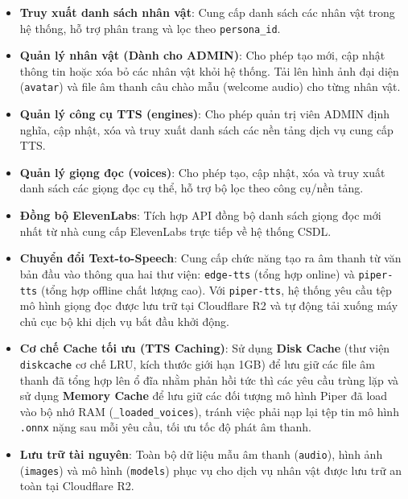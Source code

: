 \begin{itemize}
\item \textbf{Truy xuất danh sách nhân vật}: Cung cấp danh sách các nhân vật trong hệ thống, hỗ trợ phân trang và lọc theo \texttt{persona\_id}.

\item \textbf{Quản lý nhân vật (Dành cho ADMIN)}: Cho phép tạo mới, cập nhật thông tin hoặc xóa bỏ các nhân vật khỏi hệ thống. Tải lên hình ảnh đại diện (\texttt{avatar}) và file âm thanh câu chào mẫu (welcome audio) cho từng nhân vật.

\item \textbf{Quản lý công cụ TTS (engines)}: Cho phép quản trị viên ADMIN định nghĩa, cập nhật, xóa và truy xuất danh sách các nền tảng dịch vụ cung cấp TTS.

\item \textbf{Quản lý giọng đọc (voices)}: Cho phép tạo, cập nhật, xóa và truy xuất danh sách các giọng đọc cụ thể, hỗ trợ bộ lọc theo công cụ/nền tảng.

\item \textbf{Đồng bộ ElevenLabs}: Tích hợp API đồng bộ danh sách giọng đọc mới nhất từ nhà cung cấp ElevenLabs trực tiếp về hệ thống CSDL.

\item \textbf{Chuyển đổi Text-to-Speech}: Cung cấp chức năng tạo ra âm thanh từ văn bản đầu vào thông qua hai thư viện: \texttt{edge-tts} (tổng hợp online) và \texttt{piper-tts} (tổng hợp offline chất lượng cao). Với \texttt{piper-tts}, hệ thống yêu cầu tệp mô hình giọng đọc được lưu trữ tại Cloudflare R2 và tự động tải xuống máy chủ cục bộ khi dịch vụ bắt đầu khởi động.

\item \textbf{Cơ chế Cache tối ưu (TTS Caching)}: Sử dụng \textbf{Disk Cache} (thư viện \texttt{diskcache} cơ chế LRU, kích thước giới hạn 1GB) để lưu giữ các file âm thanh đã tổng hợp lên ổ đĩa nhằm phản hồi tức thì các yêu cầu trùng lặp và sử dụng \textbf{Memory Cache} để lưu giữ các đối tượng mô hình Piper đã load vào bộ nhớ RAM (\texttt{\_loaded\_voices}), tránh việc phải nạp lại tệp tin mô hình \texttt{.onnx} nặng sau mỗi yêu cầu, tối ưu tốc độ phát âm thanh.

\item \textbf{Lưu trữ tài nguyên}: Toàn bộ dữ liệu mẫu âm thanh (\texttt{audio}), hình ảnh (\texttt{images}) và mô hình (\texttt{models}) phục vụ cho dịch vụ nhân vật được lưu trữ an toàn tại Cloudflare R2.
\end{itemize}


